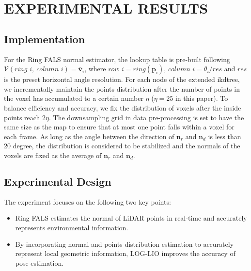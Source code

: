 \documentclass[letterpaper, 10 pt, conference]{ieeeconf}  %
\newcommand{\ie}{i.e.\ }
\begin{document}


\section{EXPERIMENTAL RESULTS}
\label{sec:experimental_results}

\subsection{Implementation}
For the Ring FALS normal estimator, the lookup table is pre-built following $\mathcal{V}(ring\_i,\ column\_i) = \overline{\boldsymbol{v}}_i$, where $row\_i = ring(\boldsymbol{p}_i)$, $column\_i = \theta_i / res$ and $res$ is the preset horizontal angle resolution.
For each node of the extended ikdtree, we incrementally maintain the points distribution after the number of points in the voxel has accumulated to a certain number $\eta$ ($\eta=25$ in this paper).
To balance efficiency and accuracy, we fix the distribution of voxels after the inside points reach $2\eta$.
The downsampling grid in data pre-processing is set to have the same size as the map to ensure that at most one point falls within a voxel for each frame.
As long as the angle between the direction of $\boldsymbol{n}_r$ and $\boldsymbol{n}_d$ is less than 20 degree, the distribution is considered to be stabilized and the normals of the voxels are fixed as the average of $\boldsymbol{n}_r$ and $\boldsymbol{n}_d$.

\subsection{Experimental Design}
The experiment focuses on the following two key points:
\begin{itemize}
        \item
              Ring FALS estimates the normal of LiDAR points in real-time and accurately represents environmental information.
        \item
              By incorporating normal and points distribution estimation to accurately represent local geometric information, LOG-LIO improves the accuracy of pose estimation.
\end{itemize}
\end{document}
